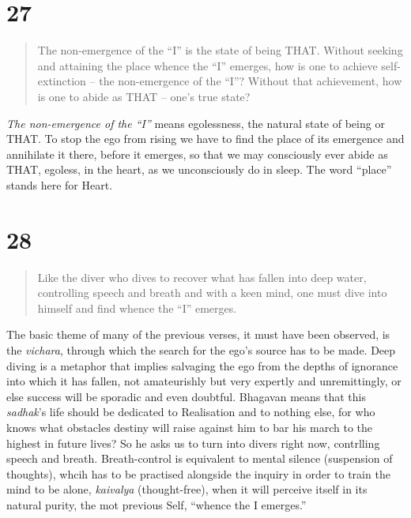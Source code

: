 \documentclass[12pt]{report}
\begin{document}
\section{27}

\begin{quote}

  The non-emergence of the ``I'' is the state of being THAT. Without
  seeking and attaining the place whence the ``I'' emerges, how is one
  to achieve self-extinction -- the non-emergence of the ``I''?
  Without that achievement, how is one to abide as THAT -- one's true
  state? 

\end{quote}

\index{}

\emph{The non-emergence of the ``I''} means egolessness, the natural
state of being or THAT. To stop the ego from rising we have to find
the place of its emergence and annihilate it there, before it
emerges, so that we may consciously ever abide as THAT, egoless, in
the heart, as we unconsciously do in sleep. The word ``place''
stands here for Heart.

\section{28}

\begin{quote}
  Like the diver who dives to recover what has fallen into deep water,
  controlling speech and breath and with a keen mind, one must dive
  into himself and find whence the ``I'' emerges.
\end{quote}

The basic theme of many of the previous verses, it must have been
observed, is the \emph{vichara}, through which the search for the
ego's source has to be made. Deep diving is a metaphor that implies
salvaging the ego from the depths of ignorance into which it has
fallen, not amateurishly but very expertly and unremittingly, or else
success will be sporadic and even doubtful. Bhagavan means that this
\emph{sadhak}'s life should be dedicated to Realisation and to nothing
else, for who knows what obstacles destiny will raise against him to
bar his march to the highest in future lives? So he asks us to turn
into divers right now, contrlling speech and breath. Breath-control is
equivalent to mental silence (suspension of thoughts), whcih has to be
practised alongside the inquiry in order to train the mind to be
alone, \emph{kaivalya} (thought-free), when it will perceive itself in
its natural purity, the mot previous Self, ``whence the I emerges.''
\end{document}
